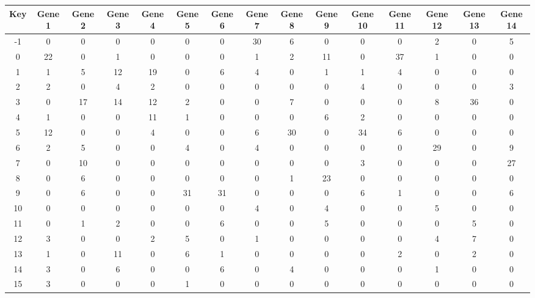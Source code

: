 \begin{tabular}{|c|c|c|c|c|c|c|c|c|c|c|c|c|c|c|}
\hline
Key & Gene 1 & Gene 2 & Gene 3 & Gene 4 & Gene 5 & Gene 6 & Gene 7 & Gene 8 & Gene 9 & Gene 10 & Gene 11 & Gene 12 & Gene 13 & Gene 14 \\
\hline
-1 & 0 & 0 & 0 & 0 & 0 & 0 & 30 & 6 & 0 & 0 & 0 & 2 & 0 & 5 \\
0 & 22 & 0 & 1 & 0 & 0 & 0 & 1 & 2 & 11 & 0 & 37 & 1 & 0 & 0 \\
1 & 1 & 5 & 12 & 19 & 0 & 6 & 4 & 0 & 1 & 1 & 4 & 0 & 0 & 0 \\
2 & 2 & 0 & 4 & 2 & 0 & 0 & 0 & 0 & 0 & 4 & 0 & 0 & 0 & 3 \\
3 & 0 & 17 & 14 & 12 & 2 & 0 & 0 & 7 & 0 & 0 & 0 & 8 & 36 & 0 \\
4 & 1 & 0 & 0 & 11 & 1 & 0 & 0 & 0 & 6 & 2 & 0 & 0 & 0 & 0 \\
5 & 12 & 0 & 0 & 4 & 0 & 0 & 6 & 30 & 0 & 34 & 6 & 0 & 0 & 0 \\
6 & 2 & 5 & 0 & 0 & 4 & 0 & 4 & 0 & 0 & 0 & 0 & 29 & 0 & 9 \\
7 & 0 & 10 & 0 & 0 & 0 & 0 & 0 & 0 & 0 & 3 & 0 & 0 & 0 & 27 \\
8 & 0 & 6 & 0 & 0 & 0 & 0 & 0 & 1 & 23 & 0 & 0 & 0 & 0 & 0 \\
9 & 0 & 6 & 0 & 0 & 31 & 31 & 0 & 0 & 0 & 6 & 1 & 0 & 0 & 6 \\
10 & 0 & 0 & 0 & 0 & 0 & 0 & 4 & 0 & 4 & 0 & 0 & 5 & 0 & 0 \\
11 & 0 & 1 & 2 & 0 & 0 & 6 & 0 & 0 & 5 & 0 & 0 & 0 & 5 & 0 \\
12 & 3 & 0 & 0 & 2 & 5 & 0 & 1 & 0 & 0 & 0 & 0 & 4 & 7 & 0 \\
13 & 1 & 0 & 11 & 0 & 6 & 1 & 0 & 0 & 0 & 0 & 2 & 0 & 2 & 0 \\
14 & 3 & 0 & 6 & 0 & 0 & 6 & 0 & 4 & 0 & 0 & 0 & 1 & 0 & 0 \\
15 & 3 & 0 & 0 & 0 & 1 & 0 & 0 & 0 & 0 & 0 & 0 & 0 & 0 & 0 \\
\hline
\end{tabular}